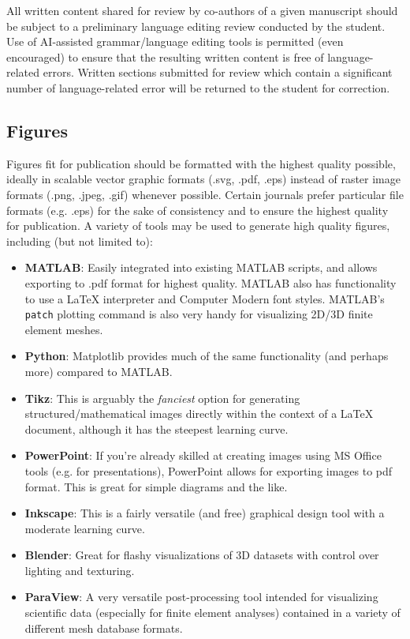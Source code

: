 \documentclass[12pt,a4paper,article,oneside]{memoir} %
\begin{document}
All written content shared for review by co-authors of a given manuscript should be subject to a preliminary language editing review conducted by the student. Use of AI-assisted grammar/language editing tools is permitted (even encouraged) to ensure that the resulting written content is free of language-related errors. Written sections submitted for review which contain a significant number of language-related error will be returned to the student for correction.

\subsection{Figures}

Figures fit for publication should be formatted with the highest quality possible, ideally in scalable vector graphic formats (.svg, .pdf, .eps) instead of raster image formats (.png, .jpeg, .gif) whenever possible. Certain journals prefer particular file formats (e.g. .eps) for the sake of consistency and to ensure the highest quality for publication. A variety of tools may be used to generate high quality figures, including (but not limited to):
\begin{itemize}
\item \textbf{MATLAB}: Easily integrated into existing MATLAB scripts, and allows exporting to .pdf format for highest quality. MATLAB also has functionality to use a \LaTeX{} interpreter and Computer Modern font styles. MATLAB's \texttt{patch} plotting command is also very handy for visualizing 2D/3D finite element meshes.
\item \textbf{Python}: Matplotlib provides much of the same functionality (and perhaps more) compared to MATLAB.
\item \textbf{Tikz}: This is arguably the \textit{fanciest} option for generating structured/mathematical images directly within the context of a \LaTeX{} document, although it has the steepest learning curve.
\item \textbf{PowerPoint}: If you're already skilled at creating images using MS Office tools (e.g. for presentations), PowerPoint allows for exporting images to pdf format. This is great for simple diagrams and the like.
\item \textbf{Inkscape}: This is a fairly versatile (and free) graphical design tool with a moderate learning curve.
\item \textbf{Blender}: Great for flashy visualizations of 3D datasets with control over lighting and texturing.
\item \textbf{ParaView}: A very versatile  post-processing tool intended for visualizing scientific data (especially for finite element analyses) contained in a variety of different mesh database formats.
\end{itemize}
\end{document}
